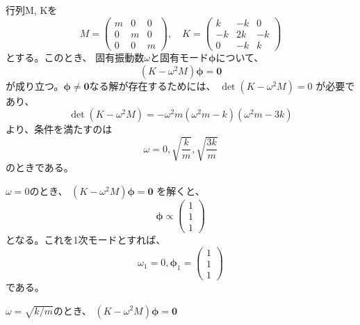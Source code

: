 \documentclass[a4paper]{jsarticle}
\begin{document}
\subsection{}
行列M, Kを
\begin{equation}
  M = 
  \begin{pmatrix}
    m & 0 & 0 \\
    0 & m & 0 \\
    0 & 0 & m
  \end{pmatrix}, \quad
  K =
  \begin{pmatrix}
    k & -k & 0 \\
    -k & 2k & -k \\
    0 & -k & k
  \end{pmatrix}
\end{equation}
とする。このとき、
固有振動数$\omega$と固有モード$\boldsymbol{\phi}$について、
\begin{equation}
  \left(K -\omega^2 M\right) \boldsymbol{\phi} = \boldsymbol{0}
\end{equation}
が成り立つ。$\boldsymbol{\phi} \neq \boldsymbol{0}$なる解が存在するためには、
$\det \left(K - \omega^2 M\right) = 0$
が必要であり、
\begin{equation}
  \det \left(K - \omega^2 M\right)
  = -\omega^2 m (\omega^2 m - k) (\omega^2 m - 3k)
\end{equation}
より、条件を満たすのは
\begin{equation}
  \omega = 0, \sqrt{\frac{k}{m}}, \sqrt{\frac{3k}{m}}
\end{equation}
のときである。\par
$\omega = 0$のとき、
$(K -\omega^2 M) \boldsymbol{\phi} = \boldsymbol{0}$
を解くと、
\begin{equation}
  \boldsymbol{\phi} \propto
  \begin{pmatrix}
    1 \\ 1 \\ 1
  \end{pmatrix}
\end{equation}
となる。これを1次モードとすれば、
\begin{equation}
  \omega_1 = 0, \boldsymbol{\phi}_1 =
  \begin{pmatrix}
    1 \\ 1 \\ 1
  \end{pmatrix}
\end{equation}
である。\par
$\omega = \sqrt{k/m}$のとき、
$(K -\omega^2 M) \boldsymbol{\phi} = \boldsymbol{0}$
\end{document}
